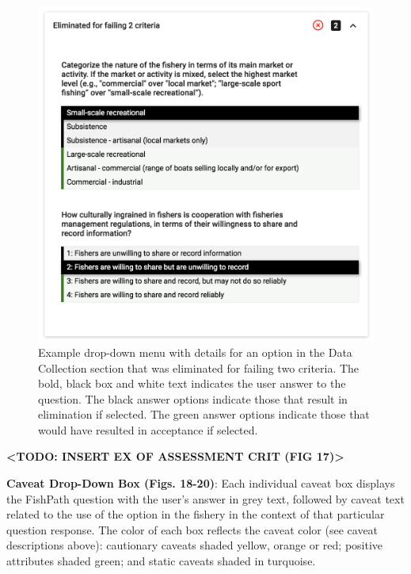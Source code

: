 \documentclass[11pt,]{book}
\begin{document}
\begin{figure}

{\centering \includegraphics[width=0.75\linewidth]{images/crit-drop-down} 

}

\caption{Example drop-down menu with details for an option in the Data Collection section that was eliminated for failing two criteria. The bold, black box and white text indicates the user answer to the question. The black answer options indicate those that result in elimination if selected. The green answer options indicate those that would have resulted in acceptance if selected.}\label{fig:crit-drop-down}
\end{figure}

\textbf{\textless TODO: INSERT EX OF ASSESSMENT CRIT (FIG
17)\textgreater{}}

\textbf{Caveat Drop-Down Box (Figs. 18-20)}: Each individual caveat box
displays the FishPath question with the user's answer in grey text,
followed by caveat text related to the use of the option in the fishery
in the context of that particular question response. The color of each
box reflects the caveat color (see caveat descriptions above):
cautionary caveats shaded yellow, orange or red; positive attributes
shaded green; and static caveats shaded in turquoise.
\end{document}
